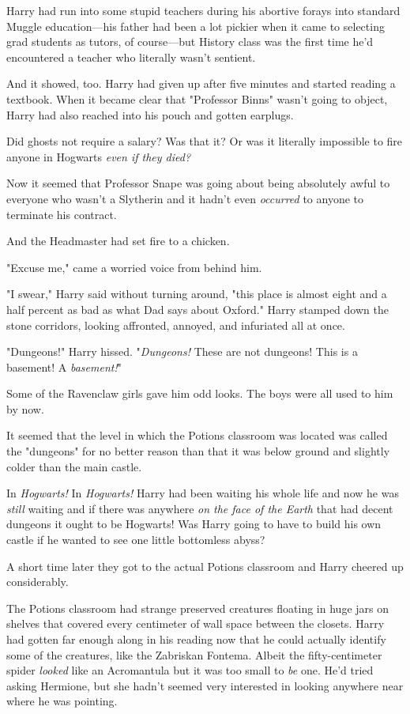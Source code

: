 Harry had run into some stupid teachers during his abortive forays into 
standard Muggle education---his father had been a lot pickier when it came to 
selecting grad students as tutors, of course---but History class was the first 
time he'd encountered a teacher who literally wasn't sentient.

And it showed, too. Harry had given up after five minutes and started reading a 
textbook. When it became clear that "Professor Binns" wasn't going to object, 
Harry had also reached into his pouch and gotten earplugs.

Did ghosts not require a salary? Was that it? Or was it literally impossible to 
fire anyone in Hogwarts \emph{even if they died?}

Now it seemed that Professor Snape was going about being absolutely awful to 
everyone who wasn't a Slytherin and it hadn't even \emph{occurred} to anyone to 
terminate his contract.

And the Headmaster had set fire to a chicken.

"Excuse me," came a worried voice from behind him.

"I swear," Harry said without turning around, "this place is almost eight and a 
half percent as bad as what Dad says about Oxford."
\sbreak
Harry stamped down the stone corridors, looking affronted, annoyed, and 
infuriated all at once.

"Dungeons!" Harry hissed. "\emph{Dungeons!}  These are not dungeons! This is a 
basement! A \emph{basement!}"

Some of the Ravenclaw girls gave him odd looks. The boys were all used to him 
by now.

It seemed that the level in which the Potions classroom was located was called 
the "dungeons" for no better reason than that it was below ground and slightly 
colder than the main castle.

In \emph{Hogwarts!} In \emph{Hogwarts!} Harry had been waiting his whole life 
and now he was \emph{still} waiting and if there was anywhere \emph{on the face 
of the Earth} that had decent dungeons it ought to be Hogwarts! Was Harry going 
to have to build his own castle if he wanted to see one little bottomless abyss?

A short time later they got to the actual Potions classroom and Harry cheered 
up considerably.

The Potions classroom had strange preserved creatures floating in huge jars on 
shelves that covered every centimeter of wall space between the closets. Harry 
had gotten far enough along in his reading now that he could actually identify 
some of the creatures, like the Zabriskan Fontema. Albeit the fifty-centimeter 
spider \emph{looked} like an Acromantula but it was too small to \emph{be} one. 
He'd tried asking Hermione, but she hadn't seemed very interested in looking 
anywhere near where he was pointing.

